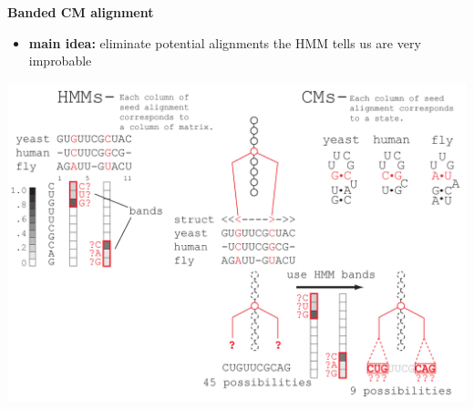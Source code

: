 \documentclass[landscape]{slides}
\begin{document}
\begin{slide}
\begin{center}
\large
\textbf{Banded CM alignment}
\end{center}
\medskip
\small
\begin{itemize}
\item
\textbf{main idea:} eliminate potential alignments the HMM tells us are very improbable
\end{itemize}
\begin{center}
\includegraphics[width=8in]{figs/post_hmm_to_cm_map2_layer16}
\end{center}
\vfill
\end{slide}
\end{document}
